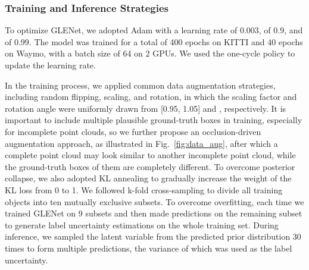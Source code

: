 \documentclass[twocolumn]{svjour3}
\begin{document}
\subsubsection{Training and Inference Strategies} 
To optimize GLENet, we adopted Adam \citep{kingma2014adam} with a learning rate of 0.003,  of 0.9, and  of 0.99. The model was trained for a total of 400 epochs on KITTI and 40 epochs on Waymo, with a batch size of 64 on 2 GPUs. We used the one-cycle policy \citep{smith2017cyclical} to update the learning rate.

In the training process, we applied common data augmentation strategies, including random flipping, scaling, and rotation, in which the scaling factor and rotation angle were uniformly drawn from [0.95, 1.05] and , respectively. It is important to include multiple plausible ground-truth boxes in training, especially for incomplete point clouds, so we further propose an occlusion-driven augmentation approach, as illustrated in Fig.~\ref{fig:data_aug}, after which a complete point cloud may look similar to another incomplete point cloud, while the ground-truth boxes of them are completely different. To overcome posterior collapse, we also adopted KL annealing \citep{bowman2016generating} to gradually increase the weight of the KL loss from 0 to 1. We followed k-fold cross-sampling to divide all training objects into ten mutually exclusive subsets. To overcome overfitting, each time we trained GLENet on 9 subsets and then made predictions on the remaining subset to generate label uncertainty estimations on the whole training set. During inference, we sampled the latent variable  from the predicted prior distribution  30 times to form multiple predictions, the variance of which was used as the label uncertainty.
\end{document}
